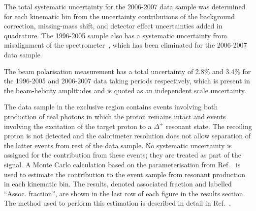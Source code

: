 The total systematic uncertainty for the 2006-2007 data sample was
determined for each kinematic bin from the uncertainty contributions of the
background correction, missing-mass shift, and detector effect
uncertainties added in quadrature.  The 1996-2005 sample also has a
systematic uncertainty from misalignment of the
spectrometer~\cite{Air09}, which has been eliminated for the 2006-2007 data sample 

The beam polarisation measurement has a total uncertainty of 2.8\% and 3.4\% for the 1996-2005 and 2006-2007 data taking periods respectively,
which is present in the beam-helicity amplitudes and is quoted as an
independent scale uncertainty. 

The data sample in the exclusive region contains events involving both
production of real photons in which the proton remains intact and
events involving the excitation of the target proton to a $\Delta^+$
resonant state. The recoiling proton is not detected and
  the calorimeter resolution does not allow separation of the latter events from rest of the data sample.
No systematic uncertainty is assigned for the contribution from these events; they are treated as part of the signal. A Monte Carlo calculation based on the parameterisation from Ref.~\cite{Bra76} is used to estimate the contribution to the event sample from resonant production in each kinematic bin. The results, denoted associated fraction and labelled ``Assoc. fraction'', are shown in the last row of each figure in the results section. The method used to perform this estimation is described in detail in
Ref.~\cite{Air08}.

